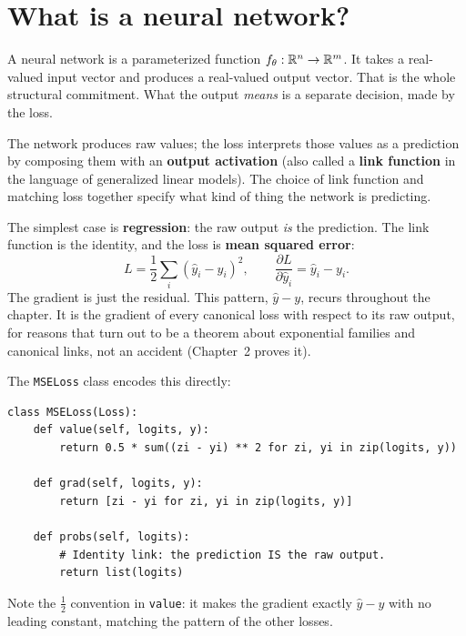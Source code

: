 
\section{What is a neural network?}\label{sec:nn-as-function}

A neural network is a parameterized function $f_\theta: \mathbb{R}^n \to \mathbb{R}^m$.
It takes a real-valued input vector and produces a real-valued output
vector. That is the whole structural commitment. What the output
\emph{means} is a separate decision, made by the loss.

The network produces raw values; the loss interprets those values as a
prediction by composing them with an \textbf{output activation} (also
called a \textbf{link function} in the language of generalized linear
models). The choice of link function and matching loss together specify
what kind of thing the network is predicting.

The simplest case is \textbf{regression}: the raw output \emph{is} the
prediction. The link function is the identity, and the loss is
\textbf{mean squared error}:
\begin{equation}\label{eq:residual}
  L = \frac{1}{2} \sum_i (\hat{y}_i - y_i)^2,
  \qquad
  \frac{\partial L}{\partial \hat{y}_i} = \hat{y}_i - y_i.
\end{equation}
The gradient is just the residual. This pattern, $\hat{y} - y$, recurs
throughout the chapter. It is the gradient of every canonical loss with
respect to its raw output, for reasons that turn out to be a theorem
about exponential families and canonical links, not an accident
(Chapter~2 proves it).

The \texttt{MSELoss} class encodes this directly:
\begin{lstlisting}
class MSELoss(Loss):
    def value(self, logits, y):
        return 0.5 * sum((zi - yi) ** 2 for zi, yi in zip(logits, y))

    def grad(self, logits, y):
        return [zi - yi for zi, yi in zip(logits, y)]

    def probs(self, logits):
        # Identity link: the prediction IS the raw output.
        return list(logits)
\end{lstlisting}
Note the $\frac{1}{2}$ convention in \texttt{value}: it makes the gradient
exactly $\hat{y} - y$ with no leading constant, matching the pattern of
the other losses.

